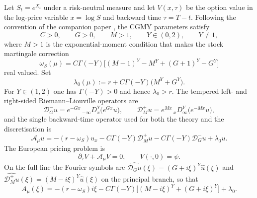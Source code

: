\documentclass[hidelinks]{siamart251216}
\newcommand{\rf}{r}
\newcommand{\Dm}{\mathcal D_G^-}
\newcommand{\Dp}{\mathcal D_M^+}
\newcommand{\Aop}{\mathcal A_\mu}
\begin{document}
Let $S_t=e^{X_t}$ under a risk-neutral measure and let $V(x,\tau)$ be the
option value in the log-price variable $x=\log S$ and backward time
$\tau=T-t$.  Following the convention of the companion paper
\cite{DamircheliCGMY2026}, the CGMY parameters satisfy
\begin{equation}
  C>0,\qquad G>0,\qquad M>1,\qquad Y\in(0,2),\qquad Y\ne1,
  \label{eq:cgmy-parameters}
\end{equation}
where $M>1$ is the exponential-moment condition that makes the stock
martingale correction
\begin{equation}
  \omega_S(\mu)
  = C\Gamma(-Y)\bigl[(M-1)^Y-M^Y+(G+1)^Y-G^Y\bigr]
  \label{eq:martingale-correction}
\end{equation}
real valued.  Set
\begin{equation}
  \lambda_0(\mu) := \rf + C\Gamma(-Y)\bigl(M^Y+G^Y\bigr).
  \label{eq:lambda0}
\end{equation}
For $Y\in(1,2)$ one has $\Gamma(-Y)>0$ and hence $\lambda_0>\rf$.  The
tempered left- and right-sided Riemann--Liouville operators are
\begin{equation}
  \Dm u=e^{-Gx}\,{}_{-\infty}D_x^Y\bigl(e^{Gx}u\bigr),
  \qquad
  \Dp u=e^{Mx}\,{}_{x}D_\infty^Y\bigl(e^{-Mx}u\bigr),
  \label{eq:tempered-ops}
\end{equation}
and the single backward-time operator used for both the theory and the
discretisation is
\begin{equation}
  \Aop u
  =-(\rf-\omega_S)u_x
   -C\Gamma(-Y)\Dp u
   -C\Gamma(-Y)\Dm u
   +\lambda_0u.
  \label{eq:cgmy-operator}
\end{equation}
The European pricing problem is
\begin{equation}
  \partial_\tau V+\Aop V=0,
  \qquad
  V(\cdot,0)=\psi.
  \label{eq:pricing-pide}
\end{equation}
On the full line the Fourier symbols are
$\widehat{\Dm u}(\xi)=(G+i\xi)^Y\widehat u(\xi)$ and
$\widehat{\Dp u}(\xi)=(M-i\xi)^Y\widehat u(\xi)$ on the principal branch, so
that
\begin{equation}
  A_\mu(\xi)
  =-(\rf-\omega_S)i\xi
   -C\Gamma(-Y)\bigl[(M-i\xi)^Y+(G+i\xi)^Y\bigr]
   +\lambda_0 .
  \label{eq:symbol}
\end{equation}
\end{document}
